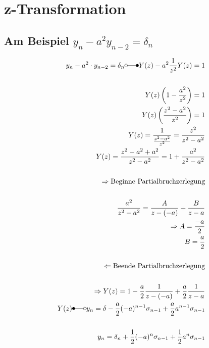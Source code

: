 \chapter{z-Transformation}


\section{Am Beispiel $y_n - a^2 y_{n-2} = \delta_n$}

\begin{align*}
	y_n - a^2\cdot y_{n-2} = \delta_n \laplace Y(z) - a^2 \frac{1}{z^2}Y(z) = 1\\
	\\
	Y(z)\left(1-\frac{a^2}{z^2}\right) = 1\\
	Y(z)\left(\frac{z^2-a^2}{z^2}\right) = 1\\
	Y(z) = \frac{1}{\frac{z^2-a^2}{z^2}} = \frac{z^2}{z^2-a^2}\\
	Y(z) = \frac{z^2-a^2+a^2}{z^2-a^2} = 1 + \frac{a^2}{z^2-a^2}\\
	\\
	\Rightarrow \text{Beginne Partialbruchzerlegung}\\
	\\
	\frac{a^2}{z^2-a^2} = \frac{A}{z-(-a)}+\frac{B}{z-a}\\
	\Rightarrow A=\frac{-a}{2}\\
	B=\frac{a}{2}\\
	\\
	\Leftarrow \text{Beende Partialbruchzerlegung}\\
	\\
	\Rightarrow Y(z) = 1-\frac{a}{2}\frac{1}{z-(-a)}+\frac{a}{2}\frac{1}{z-a}\\
	Y(z) \Laplace y_n = \delta - \frac{a}{2}(-a)^{n-1}\sigma_{n-1}+\frac{a}{2}a^{n-1}\sigma_{n-1}\\
	\\
	y_n = \delta_n+\frac{1}{2}(-a)^n\sigma_{n-1}+\frac{1}{2}a^n\sigma_{n-1}
\end{align*}
